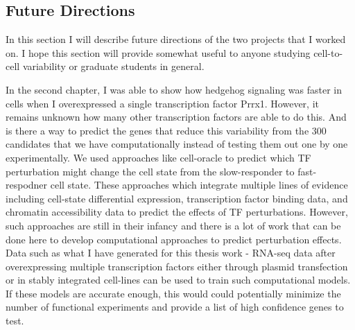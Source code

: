 \subsection{Future Directions}

In this section I will describe future directions of the two projects that I worked on. I hope this section will provide somewhat useful to anyone studying cell-to-cell variability or graduate students in general. 

In the second chapter, I was able to show how hedgehog signaling was faster in cells when I overexpressed a single transcription factor Prrx1. However, it remains unknown how many other transcription factors are able to do this. And is there a way to predict the genes that reduce this variability from the 300 candidates that we have computationally instead of testing them out one by one experimentally. We used approaches like cell-oracle \cite{cell-oracle} to predict which TF perturbation might change the cell state from the slow-responder to fast-respodner cell state. These approaches which integrate multiple lines of evidence including cell-state differential expression, transcription factor binding data, and chromatin accessibility data to predict the effects of TF perturbations. However, such approaches are still in their infancy and there is a lot of work that can be done here to develop computational approaches to predict perturbation effects. Data such as what I have generated for this thesis work - RNA-seq data after overexpressing multiple transcription factors either through plasmid transfection or in stably integrated cell-lines can be used to train such computational models. If these models are accurate enough, this would could potentially minimize the number of functional experiments and provide a list of high confidence genes to test.

